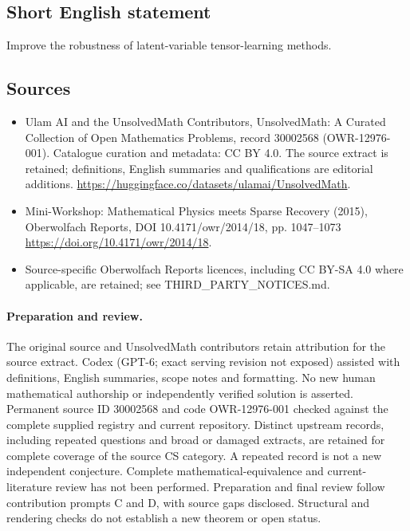\documentclass[11pt]{article}
\begin{document}
\subsection{Short English statement}
Improve the robustness of latent-variable tensor-learning methods.
\subsection{Sources}
\begin{itemize}
\item[\hypertarget{source:30002568:1}{S1}] Ulam AI and the UnsolvedMath Contributors, UnsolvedMath: A Curated Collection of Open Mathematics Problems, record 30002568 (OWR-12976-001). Catalogue curation and metadata: CC BY 4.0. The source extract is retained; definitions, English summaries and qualifications are editorial additions.
\url{https://huggingface.co/datasets/ulamai/UnsolvedMath}.
\item[\hypertarget{source:30002568:2}{S2}] Mini-Workshop: Mathematical Physics meets Sparse Recovery (2015), Oberwolfach Reports, DOI 10.4171/owr/2014/18, pp. 1047--1073
\url{https://doi.org/10.4171/owr/2014/18}.
\item Source-specific Oberwolfach Reports licences, including CC BY-SA 4.0 where applicable, are retained; see THIRD\_PARTY\_NOTICES.md.
\end{itemize}
\paragraph{Preparation and review.}
The original source and UnsolvedMath contributors retain attribution for the source extract. Codex (GPT-6; exact serving revision not exposed) assisted with definitions, English summaries, scope notes and formatting. No new human mathematical authorship or independently verified solution is asserted. Permanent source ID 30002568 and code OWR-12976-001 checked against the complete supplied registry and current repository. Distinct upstream records, including repeated questions and broad or damaged extracts, are retained for complete coverage of the source CS category. A repeated record is not a new independent conjecture. Complete mathematical-equivalence and current-literature review has not been performed. Preparation and final review follow contribution prompts C and D, with source gaps disclosed. Structural and rendering checks do not establish a new theorem or open status.
\label{end:30002568}
\end{document}
